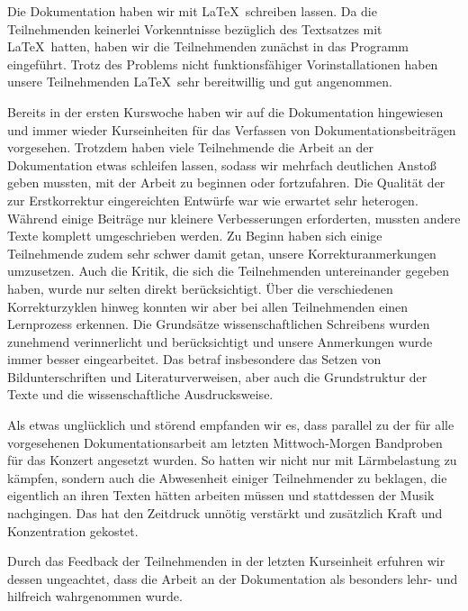 \documentclass{scrartcl}
\begin{document}
Die Dokumentation haben wir mit \LaTeX\ schreiben lassen. Da die Teilnehmenden keinerlei Vorkenntnisse bez{\"u}glich des Textsatzes mit \LaTeX\ hatten, haben wir die Teilnehmenden zun{\"a}chst in das Programm eingef{\"u}hrt. Trotz des Problems nicht funktionsf{\"a}higer Vorinstallationen haben unsere Teilnehmenden \LaTeX\ sehr bereitwillig und gut angenommen.\medskip

Bereits in der ersten Kurswoche haben wir auf die Dokumentation hingewiesen und immer wieder Kurseinheiten f{\"u}r das Verfassen von Dokumentationsbeitr{\"a}gen vorgesehen. Trotzdem haben viele Teilnehmende die Arbeit an der Dokumentation etwas schleifen lassen, sodass wir mehrfach deutlichen Ansto{\ss} geben mussten, mit der Arbeit zu beginnen oder fortzufahren. Die Qualit{\"a}t der zur Erstkorrektur eingereichten Entw{\"u}rfe war wie erwartet sehr heterogen. W{\"a}hrend einige Beitr{\"a}ge nur kleinere Verbesserungen erforderten, mussten andere Texte komplett umgeschrieben werden. Zu Beginn haben sich einige Teilnehmende zudem sehr schwer damit getan, unsere Korrekturanmerkungen umzusetzen. Auch die Kritik, die sich die Teilnehmenden untereinander gegeben haben, wurde nur selten direkt ber{\"u}cksichtigt. {\"U}ber die verschiedenen Korrekturzyklen hinweg konnten wir aber bei allen Teilnehmenden einen Lernprozess erkennen. Die Grunds{\"a}tze wissenschaftlichen Schreibens wurden zunehmend verinnerlicht und ber{\"u}cksichtigt und unsere Anmerkungen wurde immer besser eingearbeitet. Das betraf insbesondere das Setzen von Bildunterschriften und Literaturverweisen, aber auch die Grundstruktur der Texte und die wissenschaftliche Ausdrucksweise.\medskip

Als etwas ungl{\"u}cklich und st{\"o}rend empfanden wir es, dass parallel zu der f{\"u}r alle vorgesehenen Dokumentationsarbeit am letzten Mittwoch-Morgen Bandproben f{\"u}r das Konzert angesetzt wurden. So hatten wir nicht nur mit L{\"a}rmbelastung zu k{\"a}mpfen, sondern auch die Abwesenheit einiger Teilnehmender zu beklagen, die eigentlich an ihren Texten h{\"a}tten arbeiten m{\"u}ssen und stattdessen der Musik nachgingen. Das hat den Zeitdruck unn{\"o}tig verst{\"a}rkt und zus{\"a}tzlich Kraft und Konzentration gekostet.\medskip

Durch das Feedback der Teilnehmenden in der letzten Kurseinheit erfuhren wir dessen ungeachtet, dass die Arbeit an der Dokumentation als besonders lehr- und hilfreich wahrgenommen wurde.
\end{document}
